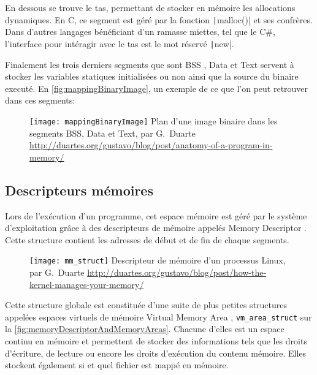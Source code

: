 En dessous se trouve le tas, permettant de stocker en mémoire les allocations dynamiques. En C, ce segment est géré par la fonction \texttt|malloc()| et ses confrères. Dans d'autres langages bénéficiant d'un ramasse miettes, tel que le C\#, l'interface pour intéragir avec le tas est le mot réservé \texttt|new|.

Finalement les trois derniers segments que sont \og BSS \fg, \og Data \fg et \og Text \fg servent à stocker les variables statiques initialisées ou non ainsi que la source du binaire executé. En \autoref{fig:mappingBinaryImage}, un exemple de ce que l'on peut retrouver dans ces segments:

\begin{figure}[H]
	\centering
	\texttt{[image: mappingBinaryImage]}
	{Plan d'une image binaire dans les segments BSS, Data et Text, par G.~Duarte}
	{\url{http://duartes.org/gustavo/blog/post/anatomy-of-a-program-in-memory/}}
	\label{fig:mappingBinaryImage}
\end{figure}

\subsection{Descripteurs mémoires}

Lors de l'exécution d'un programme, cet espace mémoire est géré par le système d'exploitation grâce à des descripteurs de mémoire appelés \og Memory Descriptor \fg. Cette structure contient les adresses de début et de fin de chaque segments.

\begin{figure}[H]
	\centering
	\texttt{[image: mm\_struct]}
	{Descripteur de mémoire d'un processus Linux, par G.~Duarte}
	{\url{http://duartes.org/gustavo/blog/post/how-the-kernel-manages-your-memory/}}
	\label{fig:mm_struct}
\end{figure}

Cette structure globale est constituée d'une suite de plus petites structures appelées espaces virtuels de mémoire \og Virtual Memory Area \fg, \texttt{vm_area_struct} sur la \autoref{fig:memoryDescriptorAndMemoryAreas}. Chacune d'elles est un espace continu en mémoire et permettent de stocker des informations tels que les droits d'écriture, de lecture ou encore les droits d'exécution du contenu mémoire. Elles stockent également si et quel fichier est mappé en mémoire.

